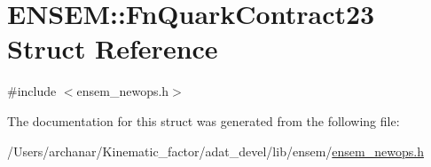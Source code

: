 \hypertarget{structENSEM_1_1FnQuarkContract23}{}\section{E\+N\+S\+EM\+:\+:Fn\+Quark\+Contract23 Struct Reference}
\label{structENSEM_1_1FnQuarkContract23}


{\ttfamily \#include $<$ensem\+\_\+newops.\+h$>$}



The documentation for this struct was generated from the following file\+:\begin{DoxyCompactItemize}
\item 
/\+Users/archanar/\+Kinematic\+\_\+factor/adat\+\_\+devel/lib/ensem/\mbox{\hyperlink{lib_2ensem_2ensem__newops_8h}{ensem\+\_\+newops.\+h}}\end{DoxyCompactItemize}
